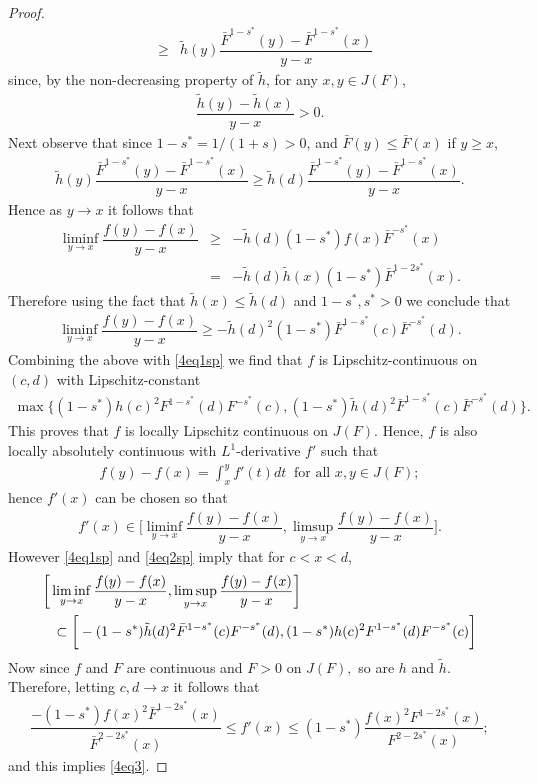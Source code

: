 \documentclass[11pt]{amsart}
\numberwithin{equation}{section}
\theoremstyle{definition}\newtheorem{definition}{Definition}
\theoremstyle{remark}\newtheorem{assumption}{Assumption}
\theoremstyle{remark}\newtheorem{remark}{Remark}
\theoremstyle{definition}\newtheorem{example}{Example}
\theoremstyle{plain}\newtheorem{question}{Question}
\theoremstyle{plain}\newtheorem{theorem}{Theorem}
\theoremstyle{plain}\newtheorem{lemma}{Lemma}
\theoremstyle{plain}\newtheorem{proposition}{Proposition}
\theoremstyle{plain}\newtheorem{corollary}{Corollary}
\theoremstyle{plain}\newtheorem{conjecture}{Conjecture}
\begin{document}
\begin{proof}
\begin{eqnarray*}
& \geq & \tilde{h}(y)\dfrac{\bar{F}^{1-s^*}(y)-\bar{F}^{1-s^*}(x)}{y-x}
\end{eqnarray*} 
since, by the non-decreasing property of $\tilde{h}$, for any $x,y\in J(F)$, 
\begin{eqnarray*}
   \dfrac{\tilde{h}(y)-\tilde{h}(x)}{y-x}>0.
\end{eqnarray*} 
Next observe that since $1-s^*=1/(1+s)>0$, and $\bar{F}(y)\leq \bar{F}(x)$ if $y\ge x$, 
\begin{eqnarray*}
\tilde{h}(y)\dfrac{\bar{F}^{1-s^*}(y)-\bar{F}^{1-s^*}(x)}{y-x}\geq \tilde{h}(d)\dfrac{\bar{F}^{1-s^*}(y)-\bar{F}^{1-s^*}(x)}{y-x}.
\end{eqnarray*}
Hence as $y\to x$ it follows that   
\begin{eqnarray*}
\liminf_{y\to x}\dfrac{f(y)-f(x)}{y-x}
& \geq & -\tilde{h}(d)(1-s^*)f(x)\bar{F}^{-s^*}(x)\\
& = & -\tilde{h}(d)\tilde{h}(x)(1-s^*)\bar{F}^{1-2s^*}(x).
\end{eqnarray*}
Therefore using the fact that $\tilde{h}(x)\leq \tilde{h}(d)$ and $1-s^*,s^*>0$ we conclude that 
\begin{eqnarray}
   \liminf_{y\to x}\dfrac{f(y)-f(x)}{y-x}\geq -\tilde{h}(d)^2(1-s^*)\bar{F}^{1-s^*}(c)\bar{F}^{-s^*}(d).
\label{4eq2sp}
\end{eqnarray}
Combining the above with \eqref{4eq1sp} we find that $f$ is Lipschitz-continuous on $(c,d)$ with Lipschitz-constant 
\begin{eqnarray*}
   \max\{(1-s^*)h(c)^2F^{1-s^*}(d)F^{-s^*}(c),(1-s^*)\tilde{h}(d)^2\bar{F}^{1-s^*}(c)\bar{F}^{-s^*}(d)\}.
\end{eqnarray*} 
This proves that $f$ is locally Lipschitz continuous on $J(F)$. 
Hence, $f$ is also locally absolutely continuous with $L^1$-derivative $f'$ such that
\begin{eqnarray*}
    f(y)-f(x)=\int_{x}^{y}f'(t)dt\ \text{  for all }x,y \in J(F);
\end{eqnarray*} 
hence $f'(x)$ can be chosen so that
\begin{eqnarray*}
    f'(x)\in\bigg[\liminf_{y\to x}\dfrac{f(y)-f(x)}{y-x},\limsup_{y\to x}\dfrac{f(y)-f(x)}{y-x}\bigg].
\end{eqnarray*} 
However \eqref{4eq1sp} and \eqref{4eq2sp} imply that for $c<x<d$,
\begin{eqnarray*}
  \lefteqn{
   \bigg[\liminf_{y\to x}\dfrac{f(y)-f(x)}{y-x},\limsup_{y\to x}\dfrac{f(y)-f(x)}{y-x}\bigg]}\\
&& \subset \bigg[-(1-s^*)\tilde{h}(d)^2\bar{F}^{1-s^*}(c)F^{-s^*}(d),(1-s^*)h(c)^2F^{1-s^*}(d)F^{-s^*}(c)\bigg]
\end{eqnarray*} 
Now since $f$ and $F$ are continuous and $F>0$ on $J(F),$ so are $h$ and $\tilde{h}$. 
Therefore,  letting $c,d\to x$ it follows that 
\begin{eqnarray*}
\dfrac{-(1-s^*)f(x)^2\bar{F}^{1-2s^*}(x)}{\bar{F}^{2-2s^*}(x)}\leq f'(x)\leq (1-s^*)\dfrac{f(x)^2F^{1-2s^*}(x)}{F^{2-2s^*}(x)};
\end{eqnarray*}
and this implies \eqref{4eq3}.
      

\end{proof}
\end{document}
